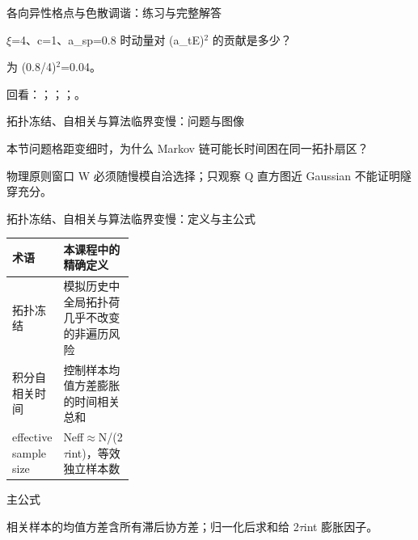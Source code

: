 \begin{frame}[t]{各向异性格点与色散调谐：练习与完整解答}
\footnotesize
\begin{block}{}\ensuremath{\xi}=4、c=1、a\_sp=0.8 时动量对 (a\_tE)\ensuremath{^{2}} 的贡献是多少？\end{block}
\begin{exampleblock}{}为 (0.8/\allowbreak{}4)\ensuremath{^{2}}=0.04。\end{exampleblock}
\vfill
\scriptsize 回看：；；；。
\end{frame}

\begin{frame}[t]{拓扑冻结、自相关与算法临界变慢：问题与图像}
\footnotesize
\begin{block}{本节问题}格距变细时，为什么 Markov 链可能长时间困在同一拓扑扇区？\end{block}
\begin{block}{物理原则}\quad 窗口 W 必须随慢模自洽选择；只观察 Q 直方图近 Gaussian 不能证明隧穿充分。\end{block}
\end{frame}

\begin{frame}[t]{拓扑冻结、自相关与算法临界变慢：定义与主公式}
\footnotesize\begin{tabularx}{\linewidth}{p{0.30\linewidth}Y}
\toprule 术语 & 本课程中的精确定义\\\midrule
{} 拓扑冻结 & 模拟历史中全局拓扑荷几乎不改变的非遍历风险\\
 积分自相关时间 & 控制样本均值方差膨胀的时间相关总和\\
 effective sample size & Neff\ensuremath{\approx}N/\allowbreak{}(2\ensuremath{\tau}int)，等效独立样本数\\
\bottomrule\end{tabularx}\vspace{0.15cm}
\begin{block}{ 主公式}\centering{}\end{block}
相关样本的均值方差含所有滞后协方差；归一化后求和给 2\ensuremath{\tau}int 膨胀因子。
\end{frame}

